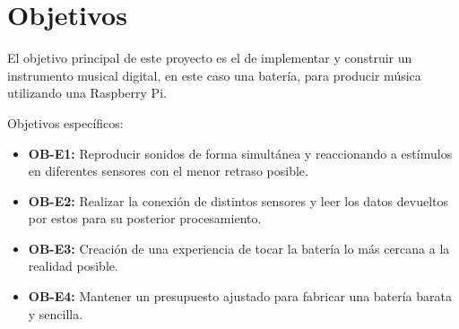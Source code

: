 
\chapter{Objetivos} %
\label{cha:Objetivos}

    El objetivo principal de este proyecto es el de implementar y construir un instrumento musical digital, en este caso
    una batería, para producir música utilizando una Raspberry Pi.

    Objetivos específicos:
    \begin{itemize}
        \item \textbf{OB-E1:} Reproducir sonidos de forma simultánea y reaccionando a estímulos en diferentes sensores
        con el menor retraso posible.
        \item \textbf{OB-E2:} Realizar la conexión de distintos sensores y leer los datos devueltos por estos para su
        posterior procesamiento.
        \item \textbf{OB-E3:} Creación de una experiencia de tocar la batería lo más cercana a la realidad posible.
        \item \textbf{OB-E4:} Mantener un presupuesto ajustado para fabricar una batería barata y sencilla.
    \end{itemize}

